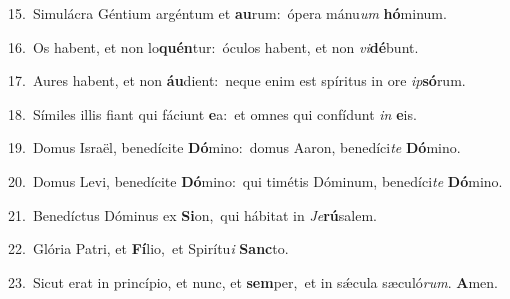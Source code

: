 {\numbfont\textcolor{\numbcolor}{15.}}~Simulácra Géntium argéntum et \textbf{au}\-rum:~\star ópera mánu\textit{um} \textbf{hó}\-minum.\par
{\numbfont\textcolor{\numbcolor}{16.}}~Os habent, et non lo\-\textbf{quén}\-tur:~\star óculos habent, et non \textit{vi}\-\textbf{dé}bunt.\par
{\numbfont\textcolor{\numbcolor}{17.}}~Aures habent, et non \textbf{áu}\-dient:~\star neque enim est spíritus in ore \textit{ip}\-\textbf{só}rum.\par
{\numbfont\textcolor{\numbcolor}{18.}}~Símiles illis fiant qui fáciunt \textbf{e}\-a:~\star et omnes qui confídunt \textit{in} \textbf{e}\-is.\par
{\numbfont\textcolor{\numbcolor}{19.}}~Domus Israël, benedícite \textbf{Dó}\-mino:~\star domus Aaron, benedíci\textit{te} \textbf{Dó}\-mino.\par
{\numbfont\textcolor{\numbcolor}{20.}}~Domus Levi, benedícite \textbf{Dó}\-mino:~\star qui timétis Dóminum, benedíci\textit{te} \textbf{Dó}\-mino.\par
{\numbfont\textcolor{\numbcolor}{21.}}~Benedíctus Dóminus ex \textbf{Si}\-on,~\star qui hábitat in \textit{Je}\-\textbf{rú}salem.\par
{\numbfont\textcolor{\numbcolor}{22.}}~Glória Patri, et \textbf{Fí}\-lio,~\star et Spirítu\textit{i} \textbf{Sanc}\-to.\par
{\numbfont\textcolor{\numbcolor}{23.}}~Sicut erat in princípio, et nunc, et \textbf{sem}\-per,~\star et in sǽcula sæculó\-\textit{rum}\-. \textbf{A}\-men.\par
